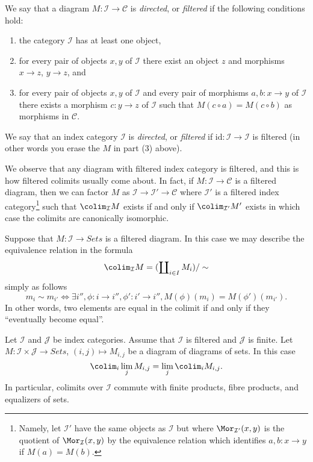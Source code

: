 \begin{definition}
\label{definition-directed}
We say that a diagram $M : \mathcal{I} \to \mathcal{C}$ is {\it directed},
or {\it filtered} if the following conditions hold:
\begin{enumerate}
\item the category $\mathcal{I}$ has at least one object,
\item for every pair of objects $x, y$ of $\mathcal{I}$
there exist an object $z$ and morphisms $x \to z$,
$y \to z$, and
\item for every pair of objects $x, y$ of $\mathcal{I}$
and every pair of morphisms $a, b : x \to y$ of $\mathcal{I}$
there exists a morphism $c : y \to z$ of $\mathcal{I}$
such that $M(c \circ a) = M(c \circ b)$ as morphisms in $\mathcal{C}$.
\end{enumerate}
We say that an index category $\mathcal{I}$ is {\it directed}, or
{\it filtered} if $\text{id} : \mathcal{I} \to \mathcal{I}$ is filtered
(in other words you erase the $M$ in part (3) above).
\end{definition}

\noindent
We observe that any diagram with filtered index category is filtered,
and this is how filtered colimits usually come about. In fact, if
$M : \mathcal{I} \to \mathcal{C}$ is a filtered diagram, then we
can factor $M$ as $\mathcal{I} \to \mathcal{I}' \to \mathcal{C}$
where $\mathcal{I}'$ is a filtered index category\footnote{Namely, let
$\mathcal{I}'$ have the same objects as $\mathcal{I}$ but
where $\Mor_{\mathcal{I}'}(x, y)$ is the quotient of $\Mor_\mathcal{I}(x, y)$
by the equivalence relation which identifies
$a, b : x \to y$ if $M(a) = M(b)$.}
such that $\colim_\mathcal{I} M$ exists if and only if
$\colim_{\mathcal{I}'} M'$ exists in which case the colimits are
canonically isomorphic.

\medskip\noindent
Suppose that $M : \mathcal{I} \to \textit{Sets}$ is a filtered diagram. In
this case we may describe the equivalence relation in the formula
$$
\colim_\mathcal{I} M
=
(\coprod\nolimits_{i\in I} M_i)/\sim
$$
simply as follows
$$
m_i \sim m_{i'}
\Leftrightarrow
\exists i'', \phi : i \to i'', \phi': i' \to i'',
M(\phi)(m_i) = M(\phi')(m_{i'}).
$$
In other words, two elements are equal in the colimit if and only if
they ``eventually become equal''.

\begin{lemma}
\label{lemma-directed-commutes}
Let $\mathcal{I}$ and $\mathcal{J}$ be index categories.
Assume that $\mathcal{I}$ is filtered and $\mathcal{J}$ is finite.
Let $M : \mathcal{I} \times \mathcal{J} \to \textit{Sets}$,
$(i, j) \mapsto M_{i, j}$ be a diagram of diagrams of sets.
In this case
$$
\colim_i \lim_j M_{i, j}
=
\lim_j \colim_i M_{i, j}.
$$
In particular, colimits over $\mathcal{I}$ commute with finite products,
fibre products, and equalizers of sets.
\end{lemma}


